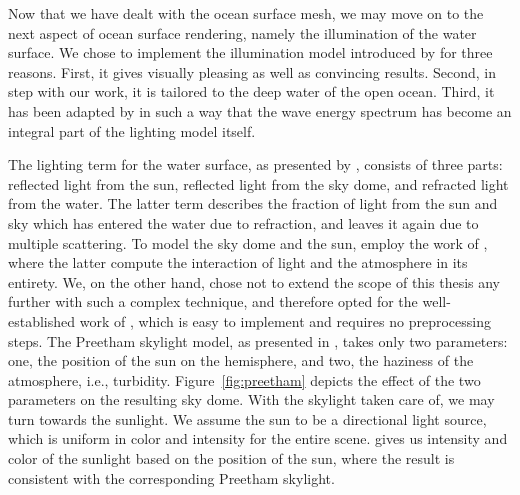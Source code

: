%
Now that we have dealt with the ocean surface mesh, we may move on to the next
aspect of ocean surface rendering, namely the illumination of the water surface.
We chose to implement the illumination model introduced by
\citet{article:oceanlighting} for three reasons. First, it gives visually
pleasing as well as convincing results. Second, in step with our work,
it is tailored to the deep water of the open ocean. Third, it has been adapted by
\citet{misc:oceanlightingfft} in such a way that the wave energy spectrum has
become an integral part of the lighting model itself.

The lighting term for the water surface, as presented by
\citeauthor{article:oceanlighting}, consists of three parts:
reflected light from the sun, reflected light from the sky dome, and refracted
light from the water. The latter term describes the fraction of light from
the sun and sky which has entered the water due to refraction, and leaves it
again due to multiple scattering.
To model the sky dome and the sun, \citeauthor{article:oceanlighting} employ the
work of \citet{Bruneton:2008}, where the latter compute the interaction of
light and the atmosphere in its entirety. We, on the other hand, chose not to
extend the scope of this thesis any further with such a complex technique, and
therefore opted for the well-established work of \citet{Preetham:1999}, which
is easy to implement and requires no preprocessing steps.
The Preetham skylight model, as presented in \citet[Section 3.1]{Preetham:1999},
takes only two parameters: one, the position of the sun on the hemisphere, and two,
the haziness of the atmosphere, i.e., turbidity.
Figure~\ref{fig:preetham} depicts the effect of the two parameters on
the resulting sky dome.
With the skylight taken care of, we may turn towards the sunlight. We assume
the sun to be a directional light source, which is uniform in color and
intensity for the entire scene. \citet[Section 3.2]{Preetham:1999} gives us
intensity and color of the sunlight based on the position of the sun, where
the result is consistent with the corresponding Preetham skylight.
